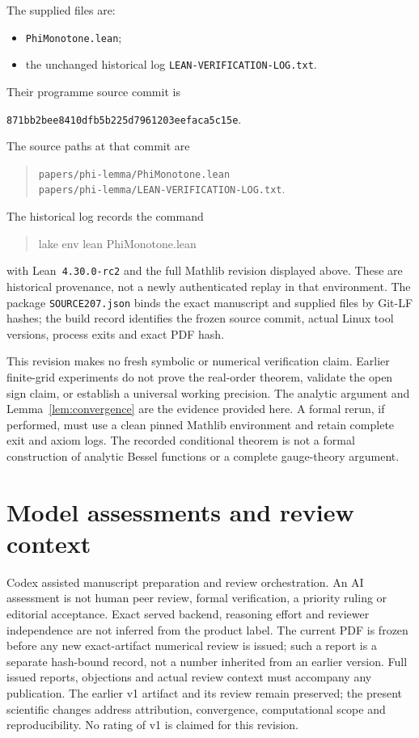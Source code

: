 \documentclass[11pt]{article}
\theoremstyle{remark}
\begin{document}
The supplied files are:
\begin{itemize}
\item \nolinkurl{PhiMonotone.lean};
\item the unchanged historical log \nolinkurl{LEAN-VERIFICATION-LOG.txt}.
\end{itemize}
Their programme source commit is
\begin{center}\small
\nolinkurl{871bb2bee8410dfb5b225d7961203eefaca5c15e}.
\end{center}
The source paths at that commit are
\begin{quote}\small
\nolinkurl{papers/phi-lemma/PhiMonotone.lean}\\
\nolinkurl{papers/phi-lemma/LEAN-VERIFICATION-LOG.txt}.
\end{quote}
The historical log records the command
\begin{quote}\small\ttfamily
lake env lean PhiMonotone.lean
\end{quote}
with Lean~\texttt{4.30.0-rc2} and the
full Mathlib revision displayed above. These are historical provenance,
not a newly authenticated replay in that environment. The package
\texttt{SOURCE207.json} binds the exact manuscript and supplied files by
Git-LF hashes; the build record identifies the frozen source commit,
actual Linux tool versions, process exits and exact PDF hash.

This revision makes no fresh symbolic or numerical verification claim.
Earlier finite-grid experiments do not prove the real-order theorem,
validate the open sign claim, or establish a universal working precision.
The analytic argument and Lemma~\ref{lem:convergence} are the evidence
provided here. A formal rerun, if performed, must use a clean pinned
Mathlib environment and retain complete exit and axiom logs. The recorded
conditional theorem is not a formal construction of analytic Bessel
functions or a complete gauge-theory argument.

\section{Model assessments and review context}

Codex assisted manuscript preparation and review orchestration. An AI
assessment is not human peer review, formal verification, a priority
ruling or editorial acceptance. Exact served backend, reasoning effort
and reviewer independence are not inferred from the product label. The
current PDF is frozen before any new exact-artifact numerical review is
issued; such a report is a separate hash-bound record, not a number
inherited from an earlier version. Full issued reports, objections and
actual review context must accompany any publication. The earlier v1
artifact and its review remain preserved; the present scientific changes
address attribution, convergence, computational scope and reproducibility.
No rating of v1 is claimed for this revision.
\end{document}
